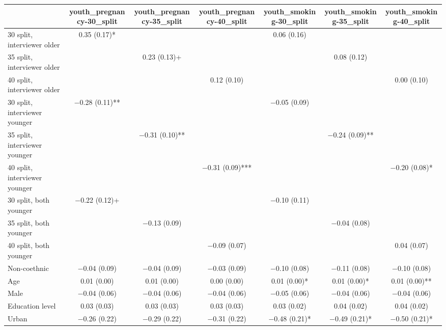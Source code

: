 \begin{table}[H]
\centering
\fontsize{7}{9}\selectfont
\begin{tabular}[t]{lcccccc}
\toprule
  & youth\_pregnancy-30\_split & youth\_pregnancy-35\_split & youth\_pregnancy-40\_split & youth\_smoking-30\_split & youth\_smoking-35\_split & youth\_smoking-40\_split\\
\midrule
30 split, interviewer older & \num{0.35} (\num{0.17})* &  &  & \num{0.06} (\num{0.16}) &  & \\
35 split, interviewer older &  & \num{0.23} (\num{0.13})+ &  &  & \num{0.08} (\num{0.12}) & \\
40 split, interviewer older &  &  & \num{0.12} (\num{0.10}) &  &  & \num{0.00} (\num{0.10})\\
30 split, interviewer younger & \num{-0.28} (\num{0.11})** &  &  & \num{-0.05} (\num{0.09}) &  & \\
35 split, interviewer younger &  & \num{-0.31} (\num{0.10})** &  &  & \num{-0.24} (\num{0.09})** & \\
40 split, interviewer younger &  &  & \num{-0.31} (\num{0.09})*** &  &  & \num{-0.20} (\num{0.08})*\\
30 split, both younger & \num{-0.22} (\num{0.12})+ &  &  & \num{-0.10} (\num{0.11}) &  & \\
35 split, both younger &  & \num{-0.13} (\num{0.09}) &  &  & \num{-0.04} (\num{0.08}) & \\
40 split, both younger &  &  & \num{-0.09} (\num{0.07}) &  &  & \num{0.04} (\num{0.07})\\
Non-coethnic & \num{-0.04} (\num{0.09}) & \num{-0.04} (\num{0.09}) & \num{-0.03} (\num{0.09}) & \num{-0.10} (\num{0.08}) & \num{-0.11} (\num{0.08}) & \num{-0.10} (\num{0.08})\\
Age & \num{0.01} (\num{0.00}) & \num{0.01} (\num{0.00}) & \num{0.00} (\num{0.00}) & \num{0.01} (\num{0.00})* & \num{0.01} (\num{0.00})* & \num{0.01} (\num{0.00})**\\
Male & \num{-0.04} (\num{0.06}) & \num{-0.04} (\num{0.06}) & \num{-0.04} (\num{0.06}) & \num{-0.05} (\num{0.06}) & \num{-0.04} (\num{0.06}) & \num{-0.04} (\num{0.06})\\
Education level & \num{0.03} (\num{0.03}) & \num{0.03} (\num{0.03}) & \num{0.03} (\num{0.03}) & \num{0.03} (\num{0.02}) & \num{0.04} (\num{0.02}) & \num{0.04} (\num{0.02})\\
Urban & \num{-0.26} (\num{0.22}) & \num{-0.29} (\num{0.22}) & \num{-0.31} (\num{0.22}) & \num{-0.48} (\num{0.21})* & \num{-0.49} (\num{0.21})* & \num{-0.50} (\num{0.21})*\\

\end{tabular}
\end{table}
